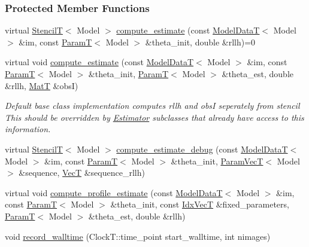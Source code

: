 \subsubsection*{Protected Member Functions}
\begin{DoxyCompactItemize}
\item 
virtual \hyperlink{namespacemappel_a3a06598240007876f8c4bf834ad86197}{StencilT}$<$ Model $>$ \hyperlink{classmappel_1_1Estimator_aa8b8c7f835056c94de1f21bff2ef205b}{compute\+\_\+estimate} (const \hyperlink{namespacemappel_a97f050df953605381ae9c901c3b125f1}{Model\+DataT}$<$ Model $>$ \&im, const \hyperlink{namespacemappel_a667925cb0d6c0e49f2f035cc5a9a6857}{ParamT}$<$ Model $>$ \&theta\+\_\+init, double \&rllh)=0
\item 
virtual void \hyperlink{classmappel_1_1Estimator_aa46d86cfb5c336c9cb8c106da036d7d1}{compute\+\_\+estimate} (const \hyperlink{namespacemappel_a97f050df953605381ae9c901c3b125f1}{Model\+DataT}$<$ Model $>$ \&im, const \hyperlink{namespacemappel_a667925cb0d6c0e49f2f035cc5a9a6857}{ParamT}$<$ Model $>$ \&theta\+\_\+init, \hyperlink{namespacemappel_a667925cb0d6c0e49f2f035cc5a9a6857}{ParamT}$<$ Model $>$ \&theta\+\_\+est, double \&rllh, \hyperlink{namespacemappel_a7091ab87c528041f7e2027195fad8915}{MatT} \&obsI)
\begin{DoxyCompactList}\small\item\em Default base class implementation computes rllh and obsI seperately from stencil This should be overridden by \hyperlink{classmappel_1_1Estimator}{Estimator} subclasses that already have access to this information. \end{DoxyCompactList}\item 
virtual \hyperlink{namespacemappel_a3a06598240007876f8c4bf834ad86197}{StencilT}$<$ Model $>$ \hyperlink{classmappel_1_1Estimator_a29c41d423941e8b86add3e493cb1375e}{compute\+\_\+estimate\+\_\+debug} (const \hyperlink{namespacemappel_a97f050df953605381ae9c901c3b125f1}{Model\+DataT}$<$ Model $>$ \&im, const \hyperlink{namespacemappel_a667925cb0d6c0e49f2f035cc5a9a6857}{ParamT}$<$ Model $>$ \&theta\+\_\+init, \hyperlink{namespacemappel_a0f86d3153e4e27b095012f140eea58de}{Param\+VecT}$<$ Model $>$ \&sequence, \hyperlink{namespacemappel_a2225ad69f358daa3f4f99282a35b9a3a}{VecT} \&sequence\+\_\+rllh)
\item 
virtual void \hyperlink{classmappel_1_1Estimator_a273f65624e06688cd4b1126e3e7556ae}{compute\+\_\+profile\+\_\+estimate} (const \hyperlink{namespacemappel_a97f050df953605381ae9c901c3b125f1}{Model\+DataT}$<$ Model $>$ \&im, const \hyperlink{namespacemappel_a667925cb0d6c0e49f2f035cc5a9a6857}{ParamT}$<$ Model $>$ \&theta\+\_\+init, const \hyperlink{namespacemappel_ac63743dcd42180127307cd0e4ecdd784}{Idx\+VecT} \&fixed\+\_\+parameters, \hyperlink{namespacemappel_a667925cb0d6c0e49f2f035cc5a9a6857}{ParamT}$<$ Model $>$ \&theta\+\_\+est, double \&rllh)
\item 
void \hyperlink{classmappel_1_1Estimator_a50125572d3b87ebcf1ffb27a8d8c643d}{record\+\_\+walltime} (Clock\+T\+::time\+\_\+point start\+\_\+walltime, int nimages)
\end{DoxyCompactItemize}
